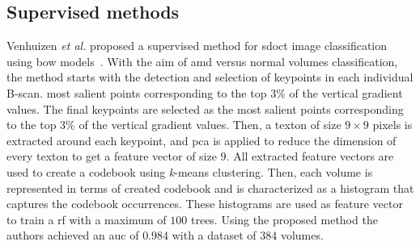 \subsection{Supervised methods}

Venhuizen \textit{et al.} proposed a supervised method for \gls{sdoct} image
classification using \gls{bow} models~\cite{Venhuizen2015}.  With the aim of
\gls{amd} versus normal volumes classification, the method starts with the
detection and selection of keypoints in each individual B-scan. %
most salient points corresponding to the top $3 \%$ of the vertical gradient
values.  The final keypoints are selected as the most salient points
corresponding to the top $3 \%$ of the vertical gradient values.  Then,
a texton of size $9 \times 9$ pixels is extracted around each keypoint, and
\gls{pca} is applied to reduce the dimension of every texton to get a feature
vector of size $9$.  All extracted feature vectors are used to create
a codebook using \textit{k}-means clustering.  Then, each volume is represented
in terms of created codebook and is characterized as a histogram that captures
the codebook occurrences.  These histograms are used as feature vector to train
a \gls{rf} with a maximum of $100$ trees.  Using the proposed method the
authors achieved an \gls{auc} of $0.984$ with a dataset of $384$ volumes.


